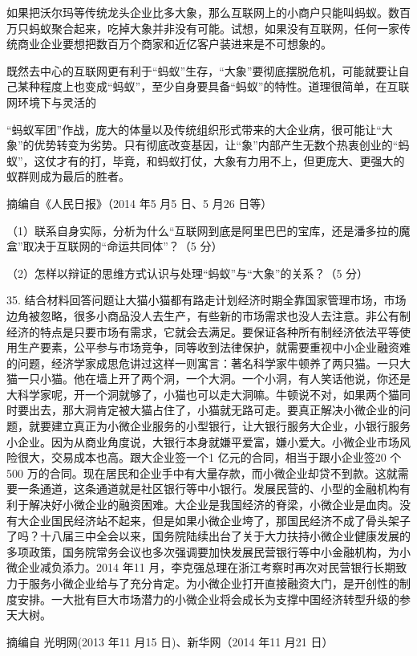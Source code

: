 \documentclass[UTF8,11pt]{ctexart}
\begin{document}
如果把沃尔玛等传统龙头企业比多大象，那么互联网上的小商户只能叫蚂蚁。数百万只蚂蚁聚合起来，吃掉大象并非没有可能。试想，如果没有互联网，任何一家传统商业企业要想把数百万个商家和近亿客户装进来是不可想象的。

既然去中心的互联网更有利于“蚂蚁”生存，“大象”要彻底摆脱危机，可能就要让自己某种程度上也变成“蚂蚁”，至少自身要具备“蚂蚁”的特性。道理很简单，在互联网环境下与灵活的

“蚂蚁军团”作战，庞大的体量以及传统组织形式带来的大企业病，很可能让“大象”的优势转变为劣势。只有彻底改变基因，让“象”内部产生无数个热衷创业的“蚂蚁”，这仗才有的打，毕竟，和蚂蚁打仗，大象有力用不上，但更庞大、更强大的蚁群则成为最后的胜者。

摘编自《人民日报》（2014 年5 月5 日、5 月26 日等）

（1）联系自身实际，分析为什么“互联网到底是阿里巴巴的宝库，还是潘多拉的魔盒”取决于互联网的“命运共同体”？（5 分）


（2）怎样以辩证的思维方式认识与处理“蚂蚁”与“大象”的关系？（5 分）


35. 结合材料回答问题让大猫小猫都有路走计划经济时期全靠国家管理市场，市场边角被忽略，很多小商品没人去生产，有些新的市场需求也没人去注意。非公有制经济的特点是只要市场有需求，它就会去满足。要保证各种所有制经济依法平等使用生产要素，公平参与市场竞争，同等收到法律保护，就需要重视中小企业融资难的问题，经济学家成思危讲过这样一则寓言：著名科学家牛顿养了两只猫。一只大猫一只小猫。他在墙上开了两个洞，一个大洞。一个小洞，有人笑话他说，你还是大科学家呢，开一个洞就够了，小猫也可以走大洞嘛。牛顿说不对，如果两个猫同时要出去，那大洞肯定被大猫占住了，小猫就无路可走。要真正解决小微企业的问题，就要建立真正为小微企业服务的小型银行，让大银行服务大企业，小银行服务小企业。因为从商业角度说，大银行本身就嫌平爱富，嫌小爱大。小微企业市场风险很大，交易成本也高。跟大企业签一个1 亿元的合同，相当于跟小企业签20 个500 万的合同。现在居民和企业手中有大量存款，而小微企业却贷不到款。这就需要一条通道，这条通道就是社区银行等中小银行。发展民营的、小型的金融机构有利于解决好小微企业的融资困难。大企业是我国经济的脊梁，小微企业是血肉。没有大企业国民经济站不起来，但是如果小微企业垮了，那国民经济不成了骨头架子了吗？十八届三中全会以来，国务院陆续出台了关于大力扶持小微企业健康发展的多项政策，国务院常务会议也多次强调要加快发展民营银行等中小金融机构，为小微企业减负添力。2014 年11 月，李克强总理在浙江考察时再次对民营银行长期致力于服务小微企业给与了充分肯定。为小微企业打开直接融资大门，是开创性的制度安排。一大批有巨大市场潜力的小微企业将会成长为支撑中国经济转型升级的参天大树。

摘编自 光明网(2013 年11 月15 日)、新华网（2014 年11 月21 日）
\end{document}
